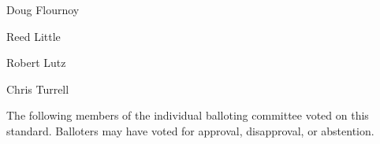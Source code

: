 \vspace{-9.75pt}
\noindent\hspace*{27pt}%
\begin{minipage}[t]{110pt}
    \frontNames Doug Flournoy
\end{minipage}%
\hspace*{47pt}%
\begin{minipage}[t]{100pt}
    \frontNames Reed Little\par
    \vspace{1.32pt}Robert Lutz
\end{minipage}%
\hspace*{52pt}%
\begin{minipage}[t]{90pt}
    \frontNames Chris Turrell
\end{minipage}\par

\vspace{16.43pt}
The following members of the individual balloting committee voted on this standard. Balloters may have\linebreak
voted for approval, disapproval, or abstention.\par

